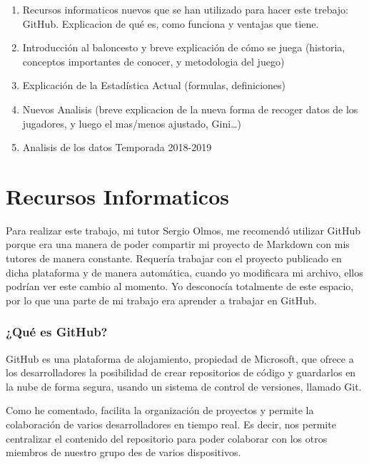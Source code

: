 \documentclass[
]{article}
\begin{document}
\begin{enumerate}
\def\labelenumi{\arabic{enumi}.}
\setcounter{enumi}{-1}
\item
  Recursos informaticos nuevos que se han utilizado para hacer este
  trebajo: GitHub. Explicacion de qué es, como funciona y ventajas que
  tiene.
\item
  Introducción al baloncesto y breve explicación de cómo se juega
  (historia, conceptos importantes de conocer, y metodologia del juego)
\item
  Explicación de la Estadística Actual (formulas, definiciones)
\item
  Nuevos Analisis (breve explicacion de la nueva forma de recoger datos
  de los jugadores, y luego el mas/menos ajustado, Gini\ldots)
\item
  Analisis de los datos Temporada 2018-2019
\end{enumerate}

\hypertarget{recursos-informaticos}{%
\section{Recursos Informaticos}\label{recursos-informaticos}}

Para realizar este trabajo, mi tutor Sergio Olmos, me recomendó utilizar
GitHub porque era una manera de poder compartir mi proyecto de Markdown
con mis tutores de manera constante. Requería trabajar con el proyecto
publicado en dicha plataforma y de manera automática, cuando yo
modificara mi archivo, ellos podrían ver este cambio al momento. Yo
desconocía totalmente de este espacio, por lo que una parte de mi
trabajo era aprender a trabajar en GitHub.

\hypertarget{quuxe9-es-github}{%
\subsubsection{¿Qué es GitHub?}\label{quuxe9-es-github}}

GitHub es una plataforma de alojamiento, propiedad de Microsoft, que
ofrece a los desarrolladores la posibilidad de crear repositorios de
código y guardarlos en la nube de forma segura, usando un sistema de
control de versiones, llamado Git.

Como he comentado, facilita la organización de proyectos y permite la
colaboración de varios desarrolladores en tiempo real. Es decir, nos
permite centralizar el contenido del repositorio para poder colaborar
con los otros miembros de nuestro grupo des de varios dispositivos.
\end{document}

